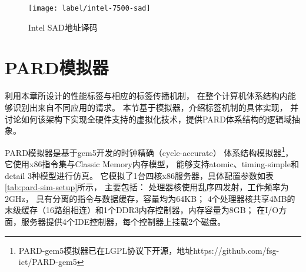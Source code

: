 \begin{figure}[tb]
  \centering
  \texttt{[image: label/intel-7500-sad]}
  \caption[Intel SAD地址译码]{Intel SAD地址译码\cite{intel-xeon-7500}}
  \label{fig:intel-7500-sad}
\end{figure}


\section{PARD模拟器}
\label{chap:labeladdrspace:nohype}

利用本章所设计的性能标签与相应的标签传播机制，
在整个计算机体系结构内能够识别出来自不同应用的请求。
本节基于模拟器，介绍标签机制的具体实现，
并讨论如何该架构下实现全硬件支持的虚拟化技术，提供PARD体系结构的逻辑域抽象。

PARD模拟器是基于gem5\cite{binkert_gem5_2011}开发的时钟精确（cycle-accurate）
体系结构模拟器\footnote{PARD-gem5模拟器已在LGPL协议下开源，地址https://github.com/fsg-ict/PARD-gem5}，
它使用x86指令集与Classic Memory内存模型，
能够支持atomic、timing-simple和detail 3种模型进行仿真。
它模拟了1台四核x86服务器，具体配置参数如表\ref{tab:pard-sim-setup}所示，
主要包括：
处理器核使用乱序四发射，工作频率为2GHz，
具有分离的指令与数据缓存，容量均为64KB；
4个处理器核共享4MB的末级缓存（16路组相连）和1个DDR3内存控制器，内存容量为8GB；
在I/O方面，服务器提供4个IDE控制器，每个控制器上挂载2个磁盘。

